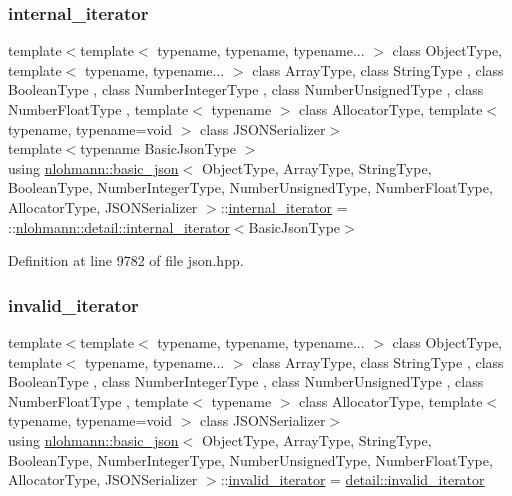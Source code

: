 \subsubsection{\texorpdfstring{internal\+\_\+iterator}{internal\_iterator}}
{\footnotesize\ttfamily template$<$template$<$ typename, typename, typename... $>$ class Object\+Type, template$<$ typename, typename... $>$ class Array\+Type, class String\+Type , class Boolean\+Type , class Number\+Integer\+Type , class Number\+Unsigned\+Type , class Number\+Float\+Type , template$<$ typename $>$ class Allocator\+Type, template$<$ typename, typename=void $>$ class J\+S\+O\+N\+Serializer$>$ \\
template$<$typename Basic\+Json\+Type $>$ \\
using \hyperlink{classnlohmann_1_1basic__json}{nlohmann\+::basic\+\_\+json}$<$ Object\+Type, Array\+Type, String\+Type, Boolean\+Type, Number\+Integer\+Type, Number\+Unsigned\+Type, Number\+Float\+Type, Allocator\+Type, J\+S\+O\+N\+Serializer $>$\+::\hyperlink{classnlohmann_1_1basic__json_a3ce72c6254981a9d378ece3c9b15e96b}{internal\+\_\+iterator} =  \+::\hyperlink{structnlohmann_1_1detail_1_1internal__iterator}{nlohmann\+::detail\+::internal\+\_\+iterator}$<$Basic\+Json\+Type$>$\hspace{0.3cm}{\ttfamily [private]}}



Definition at line 9782 of file json.\+hpp.

\mbox{\label{classnlohmann_1_1basic__json_ac13d32f7cbd02d616e71d8dc30dadcbf}} 
\subsubsection{\texorpdfstring{invalid\+\_\+iterator}{invalid\_iterator}}
{\footnotesize\ttfamily template$<$template$<$ typename, typename, typename... $>$ class Object\+Type, template$<$ typename, typename... $>$ class Array\+Type, class String\+Type , class Boolean\+Type , class Number\+Integer\+Type , class Number\+Unsigned\+Type , class Number\+Float\+Type , template$<$ typename $>$ class Allocator\+Type, template$<$ typename, typename=void $>$ class J\+S\+O\+N\+Serializer$>$ \\
using \hyperlink{classnlohmann_1_1basic__json}{nlohmann\+::basic\+\_\+json}$<$ Object\+Type, Array\+Type, String\+Type, Boolean\+Type, Number\+Integer\+Type, Number\+Unsigned\+Type, Number\+Float\+Type, Allocator\+Type, J\+S\+O\+N\+Serializer $>$\+::\hyperlink{classnlohmann_1_1basic__json_ac13d32f7cbd02d616e71d8dc30dadcbf}{invalid\+\_\+iterator} =  \hyperlink{classnlohmann_1_1detail_1_1invalid__iterator}{detail\+::invalid\+\_\+iterator}}



